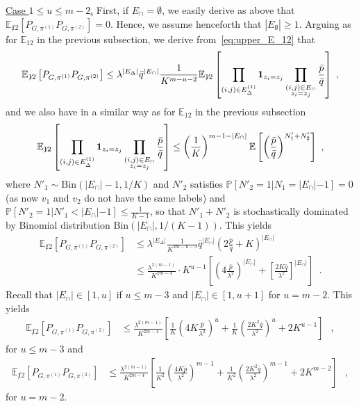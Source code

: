 \documentclass[final]{colt2026}
\newcommand{\1}{\mathbf{1}}
\newcommand{\bbE}{\mathbb{E}}
\newcommand{\bbP}{\mathbb{P}}
\newcommand{\cro}[1]{\left[#1\right]}
\begin{document}
\noindent\underline{Case $1\leq u\leq m-2$.}
First, if $E_{\cap}=\emptyset$, we easily derive as above that $\bbE_{\not 12}\cro{P_{G,\pi^{(1)}}P_{G,\pi^{(2)}}}=0$. Hence, we assume henceforth that $|E_{\emptyset}|\geq 1$.
Arguing as for $\bbE_{12}$ in the previous subsection, we derive from~\eqref{eq:upper_E_12} that 
\begin{align*}
\bbE_{\not 12}\cro{P_{G,\pi^{(1)}}P_{G,\pi^{(2)}}}\leq \lambda^{|E_{\Delta}|} \bar q^{|E_{\cap}|}\frac{1}{K^{m-u-2}}
 \bbE_{\not 12}\cro{\prod_{(i,j)\in E^{(1)}_{\Delta} }\mathbf 1_{z_{i}=z_{j}}\prod_{\substack{(i,j)\in E_{\cap}\\ z_{i}=z_{j}}}{\bar p\over \bar q}}\ , 
\end{align*}
and we also have in a similar way as for $\bbE_{12}$ in the previous subsection
\[
\bbE_{\not 12}\cro{\prod_{(i,j)\in E^{(1)}_{\Delta} }\mathbf 1_{z_{i}=z_{j}}\prod_{\substack{(i,j)\in E_{\cap}\\ z_{i}=z_{j}}}{\bar p\over \bar q}}\leq
\left(\frac{1}{K}\right)^{m-1-|E_{\cap}|}\mathbb{E}\left[ \left({\bar p\over \bar q}\right)^{N'_1+N'_2} \right]\ , 
\]
where $N'_1\sim \mathrm{Bin}(|E_{\cap}|-1,1/K)$ and $N'_2$ satisfies $\bbP[N'_2=1|N_1=|E_{\cap}|-1]=0$ (as now $v_1$ and $v_2$ do not have the same labels) and $\bbP [N'_2=1|N'_1<|E_{\cap}|-1]\leq  \frac{1}{K-1}$, so that $N'_1+N'_2$ is stochastically dominated by Binomial distribution $\mathrm{Bin}(|E_{\cap}|,1/(K-1))$. 
This yields 
\begin{align*}
\bbE_{\not 12}\cro{P_{G,\pi^{(1)}}P_{G,\pi^{(2)}}}&\leq \lambda^{|E_{\Delta}|} \frac{1}{K^{2m-u-3}} \bar q^{|E_{\cap}|} \left(2\frac{\bar{p}}{\bar{q}}+   K \right)^{|E_{\cap}|}\\
&\leq \frac{\lambda^{2(m-1)}}{K^{2m-4}}\cdot  K^{u-1}\left[\left(4 \frac{\bar{p}}{\lambda^2}\right)^{|E_{\cap}|}+ \left[\frac{2K\bar{q}}{\lambda^2} \right]^{|E_{\cap}|}  \right]\enspace . 
\end{align*}
Recall that $|E_{\cap}|\in [1,u]$ if $u\leq m-3$ and $|E_{\cap}|\in [1,u+1]$ for $u=m-2$. This yields 
\begin{align}\label{eq:upper_cross_u:middle:not12}
\bbE_{\not 12}\cro{P_{G,\pi^{(1)}}P_{G,\pi^{(2)}}}&\leq 
 \frac{\lambda^{2(m-1)}}{K^{2m-4}}\left[ \frac{1}{K}\left(4K\frac{\bar p}{\lambda^2}\right)^{u}+ %
 \frac{1}{K}\left(\frac{2K^2\bar{q}}{\lambda^2} \right)^{u} + 2K^{u-1} \right]\enspace \ , 
\end{align}
for $u\leq m-3$ and 
\begin{align}\label{eq:upper_cross_u:max:not12}
\bbE_{\not 12}\cro{P_{G,\pi^{(1)}}P_{G,\pi^{(2)}}}&\leq 
 \frac{\lambda^{2(m-1)}}{K^{2m-4}}\left[ \frac{1}{K^2} \left(\frac{4K\bar p}{\lambda^2}\right)^{m-1}+ %
 \frac{1}{K^2}\left(\frac{2K^2\bar{q}}{\lambda^2} \right)^{m-1} + 2K^{m-2} \right]\enspace \ , 
\end{align}
for $u=m-2$. 
\end{document}
